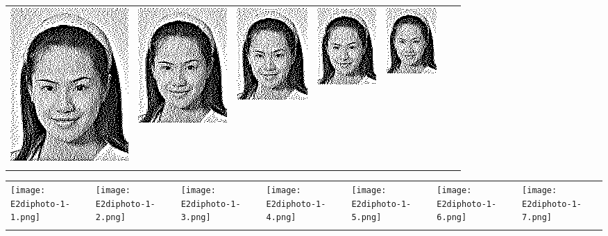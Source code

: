 \begin{tabular}{lllllll}
	\includegraphics{Ediphoto-1-3.png} &
	\includegraphics{Ediphoto-1-4.png} &
	\includegraphics{Ediphoto-1-5.png} &
	\includegraphics{Ediphoto-1-6.png} &
	\includegraphics{Ediphoto-1-7.png} \\
	 &
	 &
	 &
	 &
	 &
	 &
	 \\
\end{tabular}
\begin{tabular}{lllllll}
	\texttt{[image: E2diphoto-1-1.png]} &
	\texttt{[image: E2diphoto-1-2.png]} &
	\texttt{[image: E2diphoto-1-3.png]} &
	\texttt{[image: E2diphoto-1-4.png]} &
	\texttt{[image: E2diphoto-1-5.png]} &
	\texttt{[image: E2diphoto-1-6.png]} &
	\texttt{[image: E2diphoto-1-7.png]} \\
	 &
	 &
	 &
	 &
	 &
	 &
	 \\
\end{tabular}

